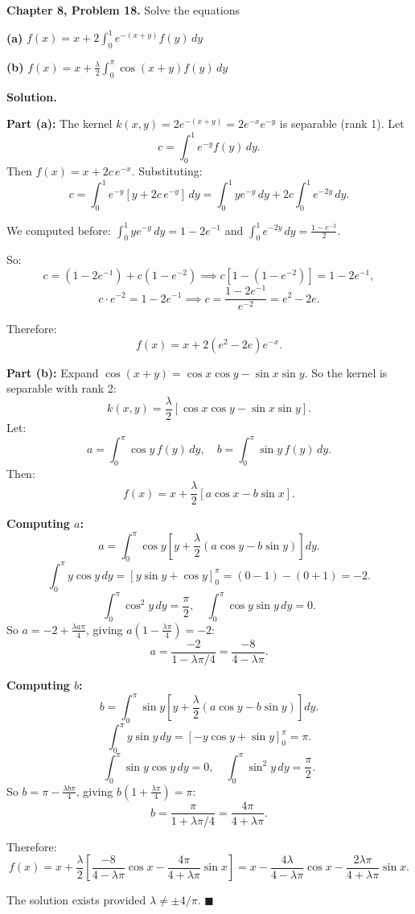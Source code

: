 \documentclass[12pt]{article}
\begin{document}
\textbf{Chapter 8, Problem 18.} Solve the equations

\textbf{(a)} $f(x) = x + 2\int_0^1 e^{-(x+y)}f(y)\,dy$

\textbf{(b)} $f(x) = x + \frac{\lambda}{2}\int_0^\pi \cos(x+y)f(y)\,dy$

\bigskip
\textbf{Solution.}

\textbf{Part (a):}
The kernel $k(x,y) = 2e^{-(x+y)} = 2e^{-x}e^{-y}$ is separable (rank 1). Let
\[
c = \int_0^1 e^{-y}f(y)\,dy.
\]
Then $f(x) = x + 2c\,e^{-x}$. Substituting:
\[
c = \int_0^1 e^{-y}[y+2c\,e^{-y}]\,dy = \int_0^1 ye^{-y}\,dy + 2c\int_0^1 e^{-2y}\,dy.
\]

We computed before: $\int_0^1 ye^{-y}\,dy = 1-2e^{-1}$ and $\int_0^1 e^{-2y}\,dy = \frac{1-e^{-2}}{2}$.

So:
\[
c = (1-2e^{-1}) + c(1-e^{-2}) \implies c[1-(1-e^{-2})] = 1-2e^{-1},
\]
\[
c\cdot e^{-2} = 1-2e^{-1} \implies c = \frac{1-2e^{-1}}{e^{-2}} = e^2 - 2e.
\]

Therefore:
\[
\boxed{f(x) = x + 2(e^2-2e)e^{-x}.}
\]

\textbf{Part (b):}
Expand $\cos(x+y) = \cos x\cos y - \sin x\sin y$. So the kernel is separable with rank 2:
\[
k(x,y) = \frac{\lambda}{2}[\cos x\cos y - \sin x\sin y].
\]
Let:
\[
a = \int_0^\pi \cos y\,f(y)\,dy, \quad b = \int_0^\pi \sin y\,f(y)\,dy.
\]
Then:
\[
f(x) = x + \frac{\lambda}{2}[a\cos x - b\sin x].
\]

\textbf{Computing $a$:}
\[
a = \int_0^\pi \cos y\left[y+\frac{\lambda}{2}(a\cos y - b\sin y)\right]dy.
\]
\[
\int_0^\pi y\cos y\,dy = [y\sin y+\cos y]_0^\pi = (0-1)-(0+1) = -2.
\]
\[
\int_0^\pi \cos^2 y\,dy = \frac{\pi}{2}, \quad \int_0^\pi \cos y\sin y\,dy = 0.
\]
So $a = -2 + \frac{\lambda a\pi}{4}$, giving $a(1-\frac{\lambda\pi}{4}) = -2$:
\[
a = \frac{-2}{1-\lambda\pi/4} = \frac{-8}{4-\lambda\pi}.
\]

\textbf{Computing $b$:}
\[
b = \int_0^\pi \sin y\left[y+\frac{\lambda}{2}(a\cos y - b\sin y)\right]dy.
\]
\[
\int_0^\pi y\sin y\,dy = [-y\cos y+\sin y]_0^\pi = \pi.
\]
\[
\int_0^\pi \sin y\cos y\,dy = 0, \quad \int_0^\pi \sin^2 y\,dy = \frac{\pi}{2}.
\]
So $b = \pi - \frac{\lambda b\pi}{4}$, giving $b(1+\frac{\lambda\pi}{4}) = \pi$:
\[
b = \frac{\pi}{1+\lambda\pi/4} = \frac{4\pi}{4+\lambda\pi}.
\]

Therefore:
\[
\boxed{f(x) = x + \frac{\lambda}{2}\left[\frac{-8}{4-\lambda\pi}\cos x - \frac{4\pi}{4+\lambda\pi}\sin x\right] = x - \frac{4\lambda}{4-\lambda\pi}\cos x - \frac{2\lambda\pi}{4+\lambda\pi}\sin x.}
\]

The solution exists provided $\lambda\neq \pm 4/\pi$. $\blacksquare$
\end{document}
